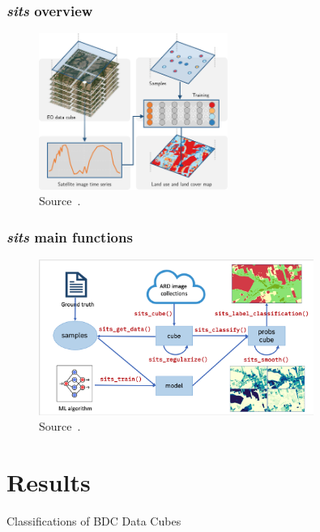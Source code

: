 \documentclass[aspectratio=169]{beamer}
\begin{document}
\begin{frame}
    \frametitle{\emph{sits} overview}
    \begin{figure}
        \centering
        \includegraphics[width=0.55\textwidth]
        {img/sits_general_view.png}
        \caption{Source~\cite{gilbertocamara2023}.}
    \end{figure}
\end{frame}



\begin{frame}
    \frametitle{\emph{sits} main functions}
    \begin{figure}
        \centering
        \includegraphics[width=0.8\textwidth]
        {img/sits_api.png}
        \caption{Source~\cite{gilbertocamara2023}.}
    \end{figure}
\end{frame}





\section{Results}



\begin{frame}
    Classifications of BDC Data Cubes
\end{frame}
\end{document}
